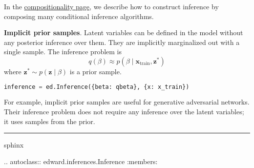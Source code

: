 In the \href{/api/inference-compositionality}{compositionality page},
we describe how to construct inference by composing
many conditional inference algorithms.

\textbf{Implicit prior samples}.
Latent variables can be defined in the model without any posterior
inference over them. They are implicitly marginalized out with a
single sample. The inference problem is
\begin{equation*}
q(\beta)\approx
p(\beta\mid\mathbf{x}_{\text{train}}, \mathbf{z}^*)
\end{equation*}
where $\mathbf{z}^*\sim p(\mathbf{z}\mid\beta)$ is a prior sample.

\begin{lstlisting}[language=Python]
inference = ed.Inference({beta: qbeta}, {x: x_train})
\end{lstlisting}

For example, implicit prior samples are useful for generative adversarial
networks. Their inference problem does not require any inference over
the latent variables; it uses samples from the prior.

\begin{center}\rule{3in}{0.4pt}\end{center}

{{sphinx

.. autoclass:: edward.inferences.Inference
   :members:

}}
